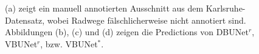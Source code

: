\begin{figure}
	\caption{(a) zeigt ein manuell annotierten Ausschnitt aus dem Karlsruhe-Datensatz, wobei Radwege 
	fälschlicherweise nicht annotiert sind. Abbildungen (b), (c) und (d) zeigen die Predictions von \ac{DBUNet}$^r$,
	\ac{VBUNet}$^r$, bzw. \ac{VBUNet}$^*$.}
	\label{fig:annotation-mistake}
\end{figure}














